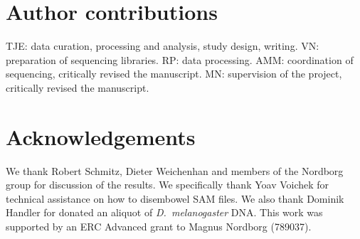 \documentclass[twocolumn,twoside,lettersize]{article}
\begin{document}
\section{Author contributions}

TJE: data curation, processing and analysis, study design, writing.
VN: preparation of sequencing libraries.
RP: data processing.
AMM: coordination of sequencing, critically revised the manuscript.
MN: supervision of the project, critically revised the manuscript.

\section{Acknowledgements}

We thank Robert Schmitz, Dieter Weichenhan and members of the Nordborg group for discussion of the results.
We specifically thank Yoav Voichek for technical assistance on how to disembowel SAM files.
We also thank Dominik Handler for donated an aliquot of \emph{D.~melanogaster} DNA.
This work was supported by an ERC Advanced grant to Magnus Nordborg (789037).

\printbibliography %
\end{document}
